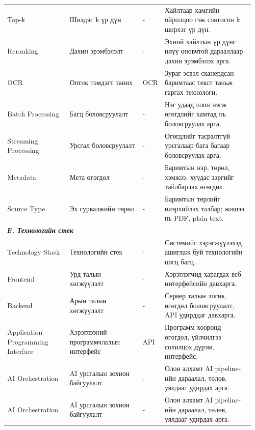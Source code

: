 {\begin{longtable}{p{} p{} p{} p{}}
Top-k & Шилдэг k үр дүн & - & Хайлтаар хамгийн ойролцоо гэж сонгосон k ширхэг үр дүн. \\

Reranking & Дахин эрэмбэлэлт & - & Эхний хайлтын үр дүнг илүү оновчтой дарааллаар дахин эрэмбэлэх арга. \\

OCR & Оптик тэмдэгт таних & OCR & Зураг эсвэл сканердсан баримтаас текст таньж гаргах технологи. \\

Batch Processing & Багц боловсруулалт & - & Нэг удаад олон нэгж өгөгдлийг хамтад нь боловсруулах арга. \\

Streaming Processing & Урсгал боловсруулалт & - & Өгөгдлийг тасралтгүй урсгалаар бага багаар боловсруулах арга. \\

Metadata & Мета өгөгдөл & - & Баримтын нэр, төрөл, хэмжээ, хуудас зэргийг тайлбарлах өгөгдөл. \\

Source Type & Эх сурвалжийн төрөл & - & Баримтын төрлийг илэрхийлэх талбар; жишээ нь PDF, plain text. \\

\midrule
\multicolumn{4}{l}{\textbf{\textit{Е. Технологийн стек}}} \\
\midrule

Technology Stack & Технологийн стек & - & Системийг хэрэгжүүлэхэд ашиглаж буй технологийн цогц багц. \\

Frontend & Урд талын хөгжүүлэлт & - & Хэрэглэгчид харагдах веб интерфейсийн давхарга. \\

Backend & Арын талын хөгжүүлэлт & - & Сервер талын логик, өгөгдөл боловсруулалт, API удирддаг давхарга. \\

Application Programming Interface & Хэрэглээний программчлалын интерфейс & API & Программ хооронд өгөгдөл, үйлчилгээ солилцох дүрэм, интерфейс. \\

AI Orchestration & AI урсгалын зохион байгуулалт & - & Олон алхамт AI pipeline-ийн дараалал, төлөв, уялдааг удирдах арга. \\

AI Orchestration & AI урсгалын зохион байгуулалт & - & Олон алхамт AI pipeline-ийн дараалал, төлөв, уялдааг удирдах арга. \\


\end{longtable}}

